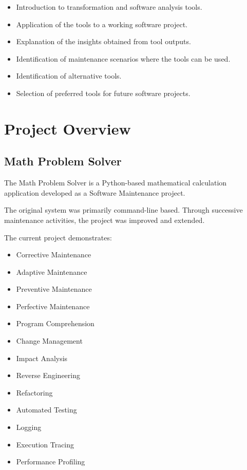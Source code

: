 \documentclass[12pt,a4paper]{report}
\begin{document}
\begin{itemize}
    \item Introduction to transformation and software analysis tools.
    \item Application of the tools to a working software project.
    \item Explanation of the insights obtained from tool outputs.
    \item Identification of maintenance scenarios where the tools can
    be used.
    \item Identification of alternative tools.
    \item Selection of preferred tools for future software projects.
\end{itemize}


\chapter{Project Overview}

\section{Math Problem Solver}

The Math Problem Solver is a Python-based mathematical calculation
application developed as a Software Maintenance project.

The original system was primarily command-line based. Through
successive maintenance activities, the project was improved and
extended.

The current project demonstrates:

\begin{itemize}
    \item Corrective Maintenance
    \item Adaptive Maintenance
    \item Preventive Maintenance
    \item Perfective Maintenance
    \item Program Comprehension
    \item Change Management
    \item Impact Analysis
    \item Reverse Engineering
    \item Refactoring
    \item Automated Testing
    \item Logging
    \item Execution Tracing
    \item Performance Profiling
\end{itemize}
\end{document}
